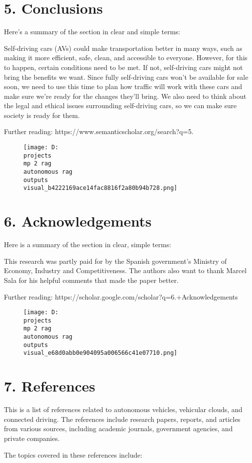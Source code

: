 \documentclass[12pt,a4paper]{article}
\begin{document}
\section{5. Conclusions}
Here's a summary of the section in clear and simple terms:

Self-driving cars (AVs) could make transportation better in many ways, such as making it more efficient, safe, clean, and accessible to everyone. However, for this to happen, certain conditions need to be met. If not, self-driving cars might not bring the benefits we want. Since fully self-driving cars won't be available for sale soon, we need to use this time to plan how traffic will work with these cars and make sure we're ready for the changes they'll bring. We also need to think about the legal and ethical issues surrounding self-driving cars, so we can make sure society is ready for them.

Further reading: https://www.semanticscholar.org/search?q=5.%
\begin{figure}[h]
\centering
\texttt{[image: D:\\projects\\mp 2 rag\\autonomous rag\\outputs\\visual\_b4222169ace14fac8816f2a80b94b728.png]}
\end{figure}
\section{6. Acknowledgements}
Here is a summary of the section in clear, simple terms:

This research was partly paid for by the Spanish government's Ministry of Economy, Industry and Competitiveness. The authors also want to thank Marcel Sala for his helpful comments that made the paper better.

Further reading: https://scholar.google.com/scholar?q=6.+Acknowledgements
\begin{figure}[h]
\centering
\texttt{[image: D:\\projects\\mp 2 rag\\autonomous rag\\outputs\\visual\_e68d0abb0e904095a006566c41e07710.png]}
\end{figure}
\section{7. References}
This is a list of references related to autonomous vehicles, vehicular clouds, and connected driving. The references include research papers, reports, and articles from various sources, including academic journals, government agencies, and private companies.

The topics covered in these references include:
\end{document}
